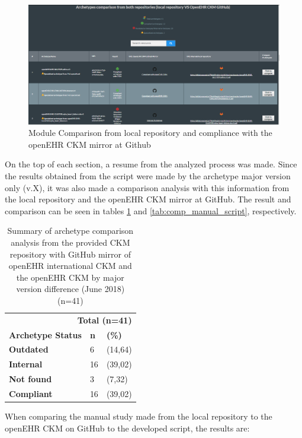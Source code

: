 \documentclass[mim_thesis.tex]{subfiles}
\begin{document}
\begin{figure}[H]
	\centering
    \includegraphics[width=1\textwidth]{img/arch_comparison.PNG}
	\caption{Module Comparison from local repository and compliance with the openEHR CKM mirror at Github}
	\label{fig:arch_comparison}
\end{figure}

On the top of each section, a resume from the analyzed process was made. Since the results obtained from the script were made by the archetype major version only (v.X), it was also made a comparison analysis with this information from the local repository and the openEHR CKM mirror at GitHub. The result and comparison can be seen in tables \ref{tab:repos_comp_mv} and \ref{tab:comp_manual_script}, respectively.

\begin{table}[H]
	\centering
	\caption{Summary of archetype comparison analysis from the provided CKM repository with GitHub mirror of openEHR international CKM and the openEHR CKM by major version difference (June 2018) (n=41)}
	\label{tab:repos_comp_mv}
	\begin{tabular}{lll}
		\toprule[2pt]
		\multicolumn{3}{r}{\textbf{ Total (n=41) }} \\
		\cmidrule(r){2-3}
		\textbf{Archetype Status}   & \textbf{n} & \textbf{(\%)} \\
		\midrule[2pt]
		\textbf{Outdated } & 6 & (14,64) \\
		\midrule
		\textbf{Internal } & 16 & (39,02) \\
		\midrule
		\textbf{Not found } & 3 & (7,32) \\
        \midrule
		\textbf{Compliant } & 16 & (39,02) \\
		\bottomrule[2pt]
	\end{tabular}
\end{table}

When comparing the manual study made from the local repository to the openEHR CKM on GitHub to the developed script, the results are:
\end{document}
